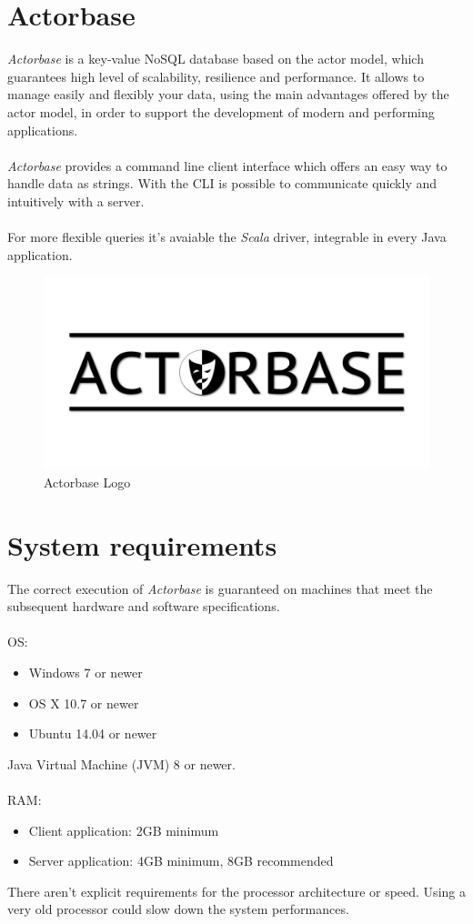 \documentclass[a4paper]{article}
\begin{document}
	\section{Actorbase}
	\emph{Actorbase} is a key-value NoSQL database based on the actor model, which guarantees high level of scalability, resilience and performance. It allows to manage easily and flexibly your data, using the main advantages offered by the actor model, in order to support the development of modern and performing applications.
	\\ \\
	\emph{Actorbase} provides a command line client interface which offers an easy way to handle data as strings. With the CLI is possible to communicate quickly and intuitively with a server.
	\\ \\
	For more flexible queries it's avaiable the \emph{Scala} driver, integrable in every Java application.
	\begin{figure}[H]
		\centering
		\includegraphics[scale=0.4]{actorbaseLogo.png}
		\caption{Actorbase Logo}
	\end{figure}

	\newpage



	\section{System requirements}	
	The correct execution of \emph{Actorbase} is guaranteed on machines that meet the subsequent hardware and software specifications.
	\\ \\
	OS:
	\begin{itemize}
		\item Windows 7 or newer
		\item OS X 10.7 or newer
		\item Ubuntu 14.04 or newer
	\end{itemize}
	Java Virtual Machine (JVM) 8 or newer.
	\\ \\
	RAM:
	\begin{itemize}
		\item Client application: 2GB minimum
		\item Server application: 4GB minimum, 8GB recommended
	\end{itemize}
	There aren't explicit requirements for the processor architecture or speed. Using a very old processor could slow down the system performances.
\end{document}
